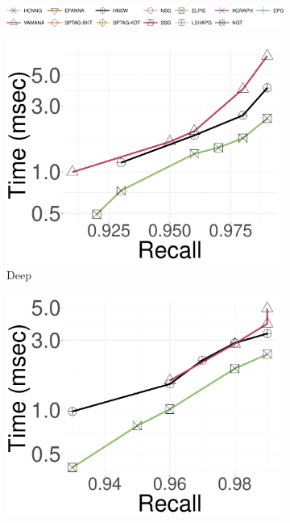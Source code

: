 	\begin{figure}
		\captionsetup{justification=centering}
		\captionsetup[subfigure]{justification=centering}
  	\centering
		\begin{subfigure}{\textwidth}
			\includegraphics[width=\textwidth]{../img/Experiments/legendall.png}
		\end{subfigure}	
		\begin{subfigure}{\soneM\textwidth}
			\includegraphics[width=\textwidth]{../img/Experiments/search/1B/deep_10nn.pdf}
			\caption{Deep}  
		\label{fig:elpis:query:performance:1B:deep:10NN}
		\end{subfigure}
    \hspace{0.4cm}
		\begin{subfigure}{\soneM\textwidth}
			\includegraphics[width=\textwidth]{../img/Experiments/search/1B/sift_10nn.pdf}

\end{subfigure}
\end{figure}
